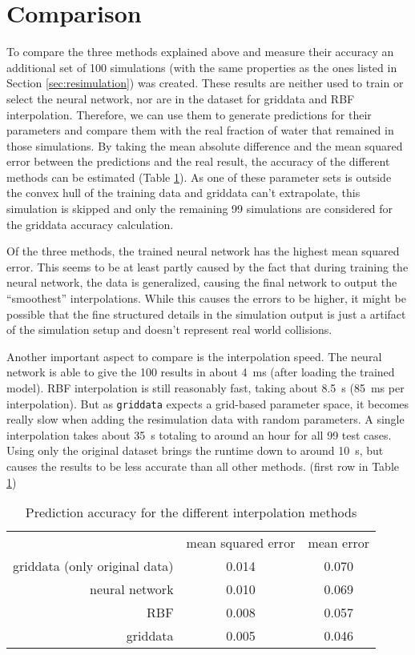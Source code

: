 \section{Comparison}
\label{sec:comparison}
To compare the three methods explained above and measure their accuracy an additional set of 100 simulations (with the same properties as the ones listed in Section \ref{sec:resimulation}) was created. These results are neither used to train or select the neural network, nor are in the dataset for griddata and RBF interpolation. Therefore, we can use them to generate predictions for their parameters and compare them with the real fraction of water that remained in those simulations. By taking the mean absolute difference and the mean squared error between the predictions and the real result, the accuracy of the different methods can be estimated (Table \ref{tab:comparison}). As one of these parameter sets is outside the convex hull of the training data and griddata can't extrapolate, this simulation is skipped and only the remaining 99 simulations are considered for the griddata accuracy calculation. 

Of the three methods, the trained neural network has the highest mean squared error. This seems to be at least partly caused by the fact that during training the neural network, the data is generalized, causing the final network to output the \enquote{smoothest} interpolations. While this causes the errors to be higher, it might be possible that the fine structured details in the simulation output is just a artifact of the simulation setup and doesn't represent real world collisions.

Another important aspect to compare is the interpolation speed. The neural network is able to give the 100 results in about \SI{4}{\milli\second} (after loading the trained model). RBF interpolation is still reasonably fast, taking about \SI{8.5}{\second} (\SI{85}{\milli\second} per interpolation). But as \texttt{griddata} expects a grid-based parameter space, it becomes really slow when adding the resimulation data with random parameters. A single interpolation takes about \SI{35}{\second} totaling to around an hour for all 99 test cases. Using only the original dataset brings the runtime down to around \SI{10}{\second}, but causes the results to be less accurate than all other methods. (first row in Table \ref{tab:comparison})

\begin{table}[h]
	\centering
	\begin{tabular}{rcc}
		                              & {mean squared error} & {mean error} \\
		griddata (only original data) &        0.014         &    0.070     \\
		               neural network &        0.010         &    0.069     \\
		                          RBF &        0.008         &    0.057     \\
		                     griddata &        0.005         &    0.046
	\end{tabular}
	\caption{Prediction accuracy for the different interpolation methods}
	\label{tab:comparison}
\end{table}